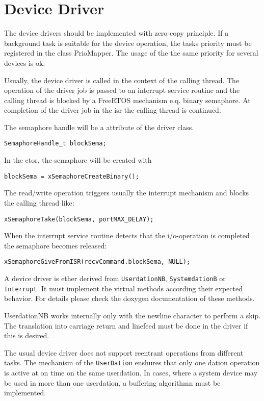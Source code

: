 \section{Device Driver}
\label{sec_microcontroller_devicedriver}

The device drivers should be implemented with zero-copy principle.
If a background task is suitable for the device operation, the 
tasks priority must be registered in the class PrioMapper. The usage
of the the same priority for several devices is ok.

Usually, the device driver is called in the context of the calling thread.
The operation of the driver job is passed to an interrupt service routine and
the calling thread is blocked by a FreeRTOS mechanism e.q. binary semaphore.
At completion of the driver job in the isr the calling thread is continued.

The semaphore handle will be a attribute of the driver class.
\begin{verbatim}
SemaphoreHandle_t blockSema;
\end{verbatim}

 In the ctor,
the semaphore will be created with 
\begin{verbatim}
blockSema = xSemaphoreCreateBinary();
\end{verbatim}

The read/write operation triggers usually the interrupt mechanism and blocks
the calling thread like:
\begin{verbatim}
xSemaphoreTake(blockSema, portMAX_DELAY);
\end{verbatim}


When the interrupt service routine detects that the i/o-operation is completed
the semaphore becomes released:
\begin{verbatim}
xSemaphoreGiveFromISR(recvCommand.blockSema, NULL);
\end{verbatim}

A device driver is ether derived from \verb|UserdationNB|,
 \verb|SystemdationB| or \verb|Interrupt|.
It must implement the virtual methods according their
expected behavior. For details please check the doxygen documentation
of these methods.

UserdationNB works internally only with the newline character to 
perform a skip. The translation into carriage return and linefeed must
be done in the driver if this is desired.

The usual device driver does not support reentrant operations from
different tasks. 
The mechanism of the \verb|UserDation| enshures that only one dation
operation is active at on time on the same userdation. In cases, where
a system device may be used in more than one userdation, a buffering
algorithmn must be implemented. 

